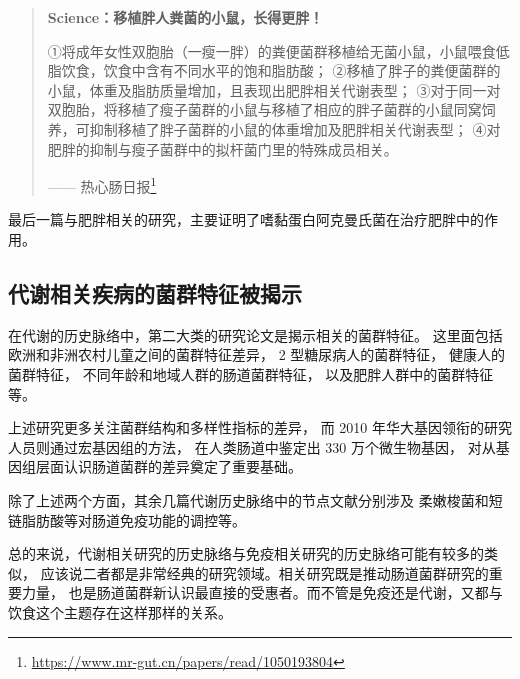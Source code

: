 \documentclass[]{ctexbook}
\renewcommand{\href}[2]{#2\footnote{\url{#1}}}
\begin{document}
\begin{quote}
\textbf{Science：移植胖人粪菌的小鼠，长得更胖！}

①将成年女性双胞胎（一瘦一胖）的粪便菌群移植给无菌小鼠，小鼠喂食低脂饮食，饮食中含有不同水平的饱和脂肪酸；
②移植了胖子的粪便菌群的小鼠，体重及脂肪质量增加，且表现出肥胖相关代谢表型；
③对于同一对双胞胎，将移植了瘦子菌群的小鼠与移植了相应的胖子菌群的小鼠同窝饲养，可抑制移植了胖子菌群的小鼠的体重增加及肥胖相关代谢表型；
④对肥胖的抑制与瘦子菌群中的拟杆菌门里的特殊成员相关。

\begin{flushright}------ \href{https://www.mr-gut.cn/papers/read/1050193804}{热心肠日报}\end{flushright}
\end{quote}

最后一篇与肥胖相关的研究，主要证明了嗜黏蛋白阿克曼氏菌在治疗肥胖中的作用\citep{everardCrosstalkAkkermansiaMuciniphila2013}。

\hypertarget{ux4ee3ux8c22ux76f8ux5173ux75beux75c5ux7684ux83ccux7fa4ux7279ux5f81ux88abux63edux793a}{%
\subsection{代谢相关疾病的菌群特征被揭示}\label{ux4ee3ux8c22ux76f8ux5173ux75beux75c5ux7684ux83ccux7fa4ux7279ux5f81ux88abux63edux793a}}

在代谢的历史脉络中，第二大类的研究论文是揭示相关的菌群特征。
这里面包括欧洲和非洲农村儿童之间的菌群特征差异\citep{filippoImpactDietShaping2010}，
2 型糖尿病人的菌群特征\citep{qinMetagenomewideAssociationStudy2012b}，
健康人的菌群特征\citep{huttenhowerStructureFunctionDiversity2012}，
不同年龄和地域人群的肠道菌群特征\citep{yatsunenkoHumanGutMicrobiome2012}，
以及肥胖人群中的菌群特征\citep{lechatelierRichnessHumanGut2013b}等。

上述研究更多关注菌群结构和多样性指标的差异，
而 2010 年华大基因领衔的研究人员则通过宏基因组的方法，
在人类肠道中鉴定出 330 万个微生物基因\citep{qinHumanGutMicrobial2010a}，
对从基因组层面认识肠道菌群的差异奠定了重要基础。

除了上述两个方面，其余几篇代谢历史脉络中的节点文献分别涉及
柔嫩梭菌和短链脂肪酸等对肠道免疫功能的调控等\citep{sokolFaecalibacteriumPrausnitziiAntiinflammatory2008, smithMicrobialMetabolitesShortChain2013}。

总的来说，代谢相关研究的历史脉络与免疫相关研究的历史脉络可能有较多的类似，
应该说二者都是非常经典的研究领域。相关研究既是推动肠道菌群研究的重要力量，
也是肠道菌群新认识最直接的受惠者。而不管是免疫还是代谢，又都与饮食这个主题存在这样那样的关系。
\end{document}
